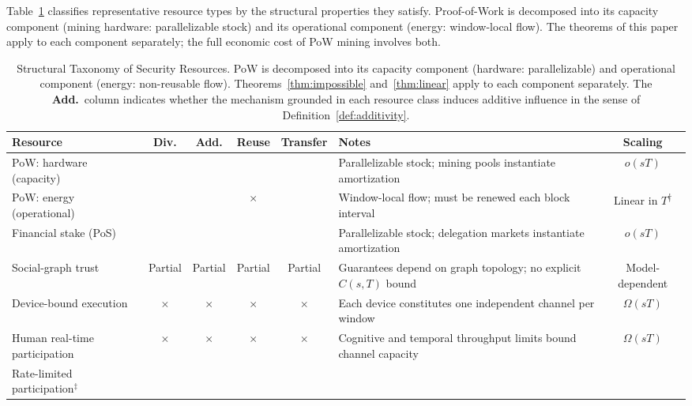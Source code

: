 \documentclass[10pt,journal,compsoc]{IEEEtran}
\theoremstyle{remark}
\begin{document}
	Table~\ref{tab:taxonomy} classifies representative
	resource types by the structural properties they satisfy.
	Proof-of-Work is decomposed into its capacity component
	(mining hardware: parallelizable stock) and its
	operational component (energy: window-local flow).
	The theorems of this paper apply to each component
	separately; the full economic cost of PoW mining
	involves both.
	
	\begin{table}[t]
		\caption{Structural Taxonomy of Security Resources.
			PoW is decomposed into its capacity component
			(hardware: parallelizable) and operational component
			(energy: non-reusable flow). Theorems~\ref{thm:impossible}
			and~\ref{thm:linear} apply to each component separately.
			The \textbf{Add.}\ column indicates whether the mechanism
			grounded in each resource class induces additive influence
			in the sense of Definition~\ref{def:additivity}.}
		\label{tab:taxonomy}
		\centering
		\renewcommand{\arraystretch}{1.35}
		\begin{tabularx}{\textwidth}{@{}lccccXc@{}}
			\toprule
			\textbf{Resource} & \textbf{Div.} & \textbf{Add.} & \textbf{Reuse} & \textbf{Transfer} & \textbf{Notes} & \textbf{Scaling} \\
			\midrule
			PoW: hardware (capacity)
			& \checkmark & \checkmark & \checkmark & \checkmark
			& Parallelizable stock; mining pools instantiate amortization
			& $o(sT)$ \\[3pt]
			PoW: energy (operational)
			& \checkmark & \checkmark & $\times$ & \checkmark
			& Window-local flow; must be renewed each block interval
			& Linear in $T$\textsuperscript{†} \\[3pt]
			Financial stake (PoS)
			& \checkmark & \checkmark & \checkmark & \checkmark
			& Parallelizable stock; delegation markets instantiate amortization
			& $o(sT)$ \\[3pt]
			Social-graph trust
			& Partial & Partial & Partial & Partial
			& Guarantees depend on graph topology; no explicit $C(s,T)$ bound
			& Model-dependent \\[3pt]
			Device-bound execution
			& $\times$ & $\times$ & $\times$ & $\times$
			& Each device constitutes one independent channel per window
			& $\Omega(sT)$ \\[3pt]
			Human real-time participation
			& $\times$ & $\times$ & $\times$ & $\times$
			& Cognitive and temporal throughput limits bound channel capacity
			& $\Omega(sT)$ \\[3pt]
			Rate-limited participation$^{\ddagger}$

\end{tabularx}
\end{table}
\end{document}

